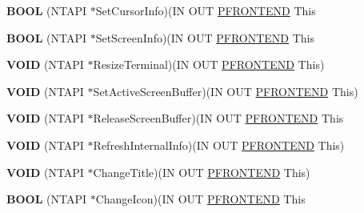 \begin{DoxyCompactItemize}
{\bfseries B\+O\+OL} (N\+T\+A\+PI $\ast$Set\+Cursor\+Info)(IN O\+UT \hyperlink{struct___f_r_o_n_t_e_n_d}{P\+F\+R\+O\+N\+T\+E\+ND} This
\item 
\mbox{\label{struct___f_r_o_n_t_e_n_d___v_t_b_l_a6c3f945c98fdf857c2ecee10f854740d}} 
{\bfseries B\+O\+OL} (N\+T\+A\+PI $\ast$Set\+Screen\+Info)(IN O\+UT \hyperlink{struct___f_r_o_n_t_e_n_d}{P\+F\+R\+O\+N\+T\+E\+ND} This
\item 
\mbox{\label{struct___f_r_o_n_t_e_n_d___v_t_b_l_a32bca2a152c984ebca2d397cd2bd7eb8}} 
{\bfseries V\+O\+ID} (N\+T\+A\+PI $\ast$Resize\+Terminal)(IN O\+UT \hyperlink{struct___f_r_o_n_t_e_n_d}{P\+F\+R\+O\+N\+T\+E\+ND} This)
\item 
\mbox{\label{struct___f_r_o_n_t_e_n_d___v_t_b_l_ac5e55934f3fe19c37850e8b2a4d56ce1}} 
{\bfseries V\+O\+ID} (N\+T\+A\+PI $\ast$Set\+Active\+Screen\+Buffer)(IN O\+UT \hyperlink{struct___f_r_o_n_t_e_n_d}{P\+F\+R\+O\+N\+T\+E\+ND} This)
\item 
\mbox{\label{struct___f_r_o_n_t_e_n_d___v_t_b_l_ab40392088f88a19bc4dcb53eadaa00f9}} 
{\bfseries V\+O\+ID} (N\+T\+A\+PI $\ast$Release\+Screen\+Buffer)(IN O\+UT \hyperlink{struct___f_r_o_n_t_e_n_d}{P\+F\+R\+O\+N\+T\+E\+ND} This
\item 
\mbox{\label{struct___f_r_o_n_t_e_n_d___v_t_b_l_a050365b8f180b3d777f58e746e73a86c}} 
{\bfseries V\+O\+ID} (N\+T\+A\+PI $\ast$Refresh\+Internal\+Info)(IN O\+UT \hyperlink{struct___f_r_o_n_t_e_n_d}{P\+F\+R\+O\+N\+T\+E\+ND} This)
\item 
\mbox{\label{struct___f_r_o_n_t_e_n_d___v_t_b_l_a7697b43a07a828a9e19bff5038d1b192}} 
{\bfseries V\+O\+ID} (N\+T\+A\+PI $\ast$Change\+Title)(IN O\+UT \hyperlink{struct___f_r_o_n_t_e_n_d}{P\+F\+R\+O\+N\+T\+E\+ND} This)
\item 
\mbox{\label{struct___f_r_o_n_t_e_n_d___v_t_b_l_acacd87439352c1f2b2991e4b54ff2b81}} 
{\bfseries B\+O\+OL} (N\+T\+A\+PI $\ast$Change\+Icon)(IN O\+UT \hyperlink{struct___f_r_o_n_t_e_n_d}{P\+F\+R\+O\+N\+T\+E\+ND} This
\item 

\end{DoxyCompactItemize}
